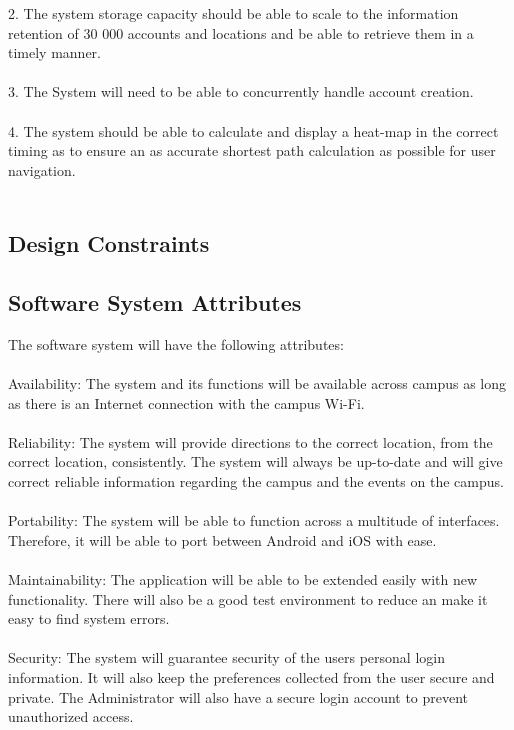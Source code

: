 \documentclass{article}
\begin{document}
{2.	The system storage capacity should be able to scale to the information retention of 30 000 accounts and locations and be able to retrieve them in a timely manner.\\\\
3.	The System will need to be able to concurrently handle account creation.\\\\
4.	The system should be able to calculate and display a heat-map in the correct timing as to ensure an as accurate shortest path calculation as possible for user navigation.\\\\

	}
        \subsection{Design Constraints}
        \subsection{Software System Attributes}
		{		
			The software system will have the following attributes:
\\\\
		Availability: The system and its functions will be available across campus as long as there is an Internet connection with the campus Wi-Fi. 
\\\\
		Reliability: The system will provide directions to the correct location, from the correct location, consistently. The system will always be up-to-date and will give correct reliable information regarding the campus and the events on the campus.
\\\\
		Portability: The system will be able to function across a multitude of interfaces. Therefore, it will be able to port between Android and iOS with ease. 
\\\\
		Maintainability: The application will be able to be extended easily with new functionality. There will also be a good test environment to reduce an make it easy to find system errors.  
\\\\
		Security: The system will guarantee security of the users personal login information. It will also keep the preferences collected from the user secure and private. The Administrator will also have a secure login account to prevent unauthorized access.}
\end{document}
